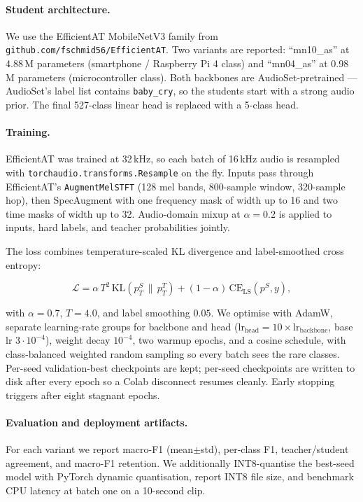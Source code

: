 \documentclass[11pt,a4paper]{article}
\begin{document}
\paragraph{Student architecture.}
We use the EfficientAT MobileNetV3 family from
\texttt{github.com/fschmid56/EfficientAT}. Two variants are reported:
``mn10\_as'' at 4.88\,M parameters (smartphone / Raspberry Pi 4 class)
and ``mn04\_as'' at 0.98\,M parameters (microcontroller class). Both
backbones are AudioSet-pretrained --- AudioSet's label list contains
\texttt{baby\_cry}, so the students start with a strong audio prior. The
final 527-class linear head is replaced with a 5-class head.

\paragraph{Training.}
EfficientAT was trained at 32\,kHz, so each batch of 16\,kHz audio is
resampled with \texttt{torchaudio.transforms.Resample} on the fly.
Inputs pass through EfficientAT's \texttt{AugmentMelSTFT} (128 mel
bands, 800-sample window, 320-sample hop), then SpecAugment with one
frequency mask of width up to 16 and two time masks of width up to 32.
Audio-domain mixup at $\alpha{=}0.2$ is applied to inputs, hard labels,
and teacher probabilities jointly.

The loss combines temperature-scaled KL divergence and label-smoothed
cross entropy:

\begin{equation}
\mathcal{L}
=\alpha\,T^{2}\,\mathrm{KL}\!\left(p^{S}_{T}\,\|\,p^{T}_{T}\right)
+(1-\alpha)\,\mathrm{CE}_{\mathrm{LS}}(p^{S},y),
\label{eq:kd}
\end{equation}

with $\alpha{=}0.7$, $T{=}4.0$, and label smoothing $0.05$. We optimise
with AdamW, separate learning-rate groups for backbone and head
($\mathrm{lr}_{\mathrm{head}}{=}10\!\times\!\mathrm{lr}_{\mathrm{backbone}}$,
base lr $3{\cdot}10^{-4}$), weight decay $10^{-4}$, two warmup epochs,
and a cosine schedule, with class-balanced weighted random sampling so
every batch sees the rare classes. Per-seed validation-best checkpoints
are kept; per-seed checkpoints are written to disk after every epoch so
a Colab disconnect resumes cleanly. Early stopping triggers after eight
stagnant epochs.

\paragraph{Evaluation and deployment artifacts.}
For each variant we report macro-F1 (mean$\pm$std), per-class F1,
teacher/student agreement, and macro-F1 retention. We additionally
INT8-quantise the best-seed model with PyTorch dynamic quantisation,
report INT8 file size, and benchmark CPU latency at batch one on a
10-second clip.
\end{document}

